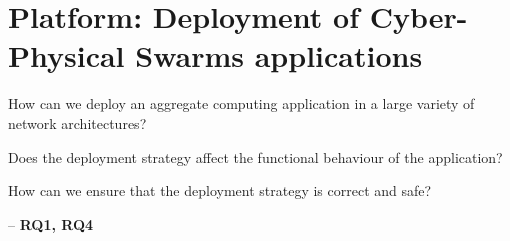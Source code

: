 \chapter{Platform: Deployment of Cyber-Physical Swarms applications}\label{chap:eng:multitier}%

\begin{flushright}
  \begin{minipage}{0.5\textwidth}
    How can we deploy an aggregate computing application in a large variety of network architectures?

    Does the deployment strategy affect the functional behaviour of the application?

    How can we ensure that the deployment strategy is correct and safe?

    -- \textbf{RQ1, RQ4}    
  \end{minipage}
\end{flushright}

